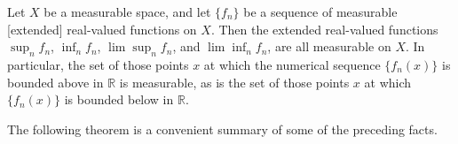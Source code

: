 Let $X$ be a measurable space, and let $\{f_n\}$ be a sequence of measurable [extended] real-valued functions on $X$. Then the extended real-valued functions $\sup_n f_n$, $\inf_n f_n$, $\lim \sup_n f_n$, and $\lim \inf_n f_n$, are all measurable on $X$. In particular, the set of those points $x$ at which the numerical sequence $\{f_n(x)\}$ is bounded above in $\mathbb{R}$ is measurable, as is the set of those points $x$ at which $\{f_n(x)\}$ is bounded below in $\mathbb{R}$.

The following theorem is a convenient summary of some of the preceding facts.
